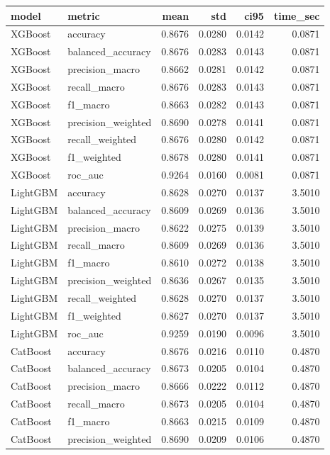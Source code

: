 \begin{tabular}{llrrrr}
\toprule
model & metric & mean & std & ci95 & time_sec \\
\midrule
XGBoost & accuracy & 0.8676 & 0.0280 & 0.0142 & 0.0871 \\
XGBoost & balanced_accuracy & 0.8676 & 0.0283 & 0.0143 & 0.0871 \\
XGBoost & precision_macro & 0.8662 & 0.0281 & 0.0142 & 0.0871 \\
XGBoost & recall_macro & 0.8676 & 0.0283 & 0.0143 & 0.0871 \\
XGBoost & f1_macro & 0.8663 & 0.0282 & 0.0143 & 0.0871 \\
XGBoost & precision_weighted & 0.8690 & 0.0278 & 0.0141 & 0.0871 \\
XGBoost & recall_weighted & 0.8676 & 0.0280 & 0.0142 & 0.0871 \\
XGBoost & f1_weighted & 0.8678 & 0.0280 & 0.0141 & 0.0871 \\
XGBoost & roc_auc & 0.9264 & 0.0160 & 0.0081 & 0.0871 \\
LightGBM & accuracy & 0.8628 & 0.0270 & 0.0137 & 3.5010 \\
LightGBM & balanced_accuracy & 0.8609 & 0.0269 & 0.0136 & 3.5010 \\
LightGBM & precision_macro & 0.8622 & 0.0275 & 0.0139 & 3.5010 \\
LightGBM & recall_macro & 0.8609 & 0.0269 & 0.0136 & 3.5010 \\
LightGBM & f1_macro & 0.8610 & 0.0272 & 0.0138 & 3.5010 \\
LightGBM & precision_weighted & 0.8636 & 0.0267 & 0.0135 & 3.5010 \\
LightGBM & recall_weighted & 0.8628 & 0.0270 & 0.0137 & 3.5010 \\
LightGBM & f1_weighted & 0.8627 & 0.0270 & 0.0137 & 3.5010 \\
LightGBM & roc_auc & 0.9259 & 0.0190 & 0.0096 & 3.5010 \\
CatBoost & accuracy & 0.8676 & 0.0216 & 0.0110 & 0.4870 \\
CatBoost & balanced_accuracy & 0.8673 & 0.0205 & 0.0104 & 0.4870 \\
CatBoost & precision_macro & 0.8666 & 0.0222 & 0.0112 & 0.4870 \\
CatBoost & recall_macro & 0.8673 & 0.0205 & 0.0104 & 0.4870 \\
CatBoost & f1_macro & 0.8663 & 0.0215 & 0.0109 & 0.4870 \\
CatBoost & precision_weighted & 0.8690 & 0.0209 & 0.0106 & 0.4870 \\

\end{tabular}
